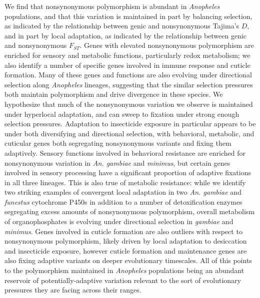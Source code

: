 We find that nonsynonymous polymorphism is abundant in 
\textit{Anopheles} populations, and that this variation is maintained
in part by balancing selection, as indicated by the relationship 
between genic and nonsynonymous Tajima's $D$, 
and in part by local adaptation, as indicated by the relationship 
between genic and nonsynonymous $F_{ST}$.
Genes with elevated nonsynonymous polymorphism are enriched for 
sensory and metabolic functions, particularly
redox metabolism; we also identify
a number of specific genes involved in immune response and cuticle formation.
Many of these genes and functions are also evolving under 
directional selection along \textit{Anopheles} lineages,
suggesting that the similar selection pressures both maintain 
polymorphism and drive divergence in these species.
We hypothesize that much of the nonsynonymous variation we observe 
is maintained under hyperlocal adaptation, and can sweep to fixation 
under strong enough selection pressures.
Adaptation to insecticide exposure in particular appears to be 
under both diversifying and directional selection, with behavioral, 
metabolic, and cuticular genes both segregating nonsynonymous variants 
and fixing them adaptively. 
Sensory functions involved in behavioral resistance are enriched for 
nonsynonymous variation in 
\textit{An. gambiae} and \textit{minimus}, but certain genes 
involved in sensory processing have 
a significant proportion of adaptive fixations in all three lineages. 
This is also true of metabolic resistance:
 while we identify two striking examples of convergent 
local adaptation in two \textit{An. gambiae} and 
\textit{funestus} cytochrome P450s in addition 
to a number of detoxification enzymes segregating 
excess amounts of nonsynonymous polymorphism, 
overall metabolism of organophosphates is evolving
under directional selection in \textit{gambiae} and \textit{minimus}.
Genes involved in cuticle formation are also 
outliers with respect to nonsynonymous polymorphism, 
likely driven by local adaptation to desiccation and insecticide exposure, 
however cuticle formation and maintenance genes are also 
fixing adaptive variants on deeper evolutionary timescales. 
All of this points to the polymorphism maintained in 
\textit{Anopheles} populations being an abundant reservoir of 
potentially-adaptive variation relevant to the sort of
evolutionary pressures they are facing across their ranges.

